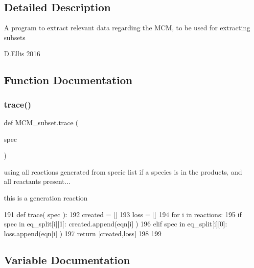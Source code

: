 \subsection{Detailed Description}
\begin{DoxyVerb}A program to extract relevant data regarding the MCM, 
to be used for extracting subsets

D.Ellis 2016
\end{DoxyVerb}
 

\subsection{Function Documentation}
\mbox{\label{namespaceMCM__subset_a4b3a88b2d7b093981b698e0227194e3f}} 
\subsubsection{\texorpdfstring{trace()}{trace()}}
{\footnotesize\ttfamily def M\+C\+M\+\_\+subset.\+trace (\begin{DoxyParamCaption}\item[{}]{spec }\end{DoxyParamCaption})}



using all reactions generated from specie list if a species is in the products, and all reactants present... 

this is a generation reaction 
\begin{DoxyCode}
191 \textcolor{keyword}{def }trace( spec ):
192     created = []
193     loss = []
194     \textcolor{keywordflow}{for} i \textcolor{keywordflow}{in} reactions: 
195         \textcolor{keywordflow}{if}  spec \textcolor{keywordflow}{in} eq\_split[i][1]: created.append(eqn[i] )
196         \textcolor{keywordflow}{elif} spec \textcolor{keywordflow}{in} eq\_split[i][0]:   loss.append(eqn[i] )
197     \textcolor{keywordflow}{return} [created,loss]
198 
199  
\end{DoxyCode}


\subsection{Variable Documentation}
\mbox{\label{namespaceMCM__subset_ab8959877efe918631bc51a8d27bbdd53}} 
